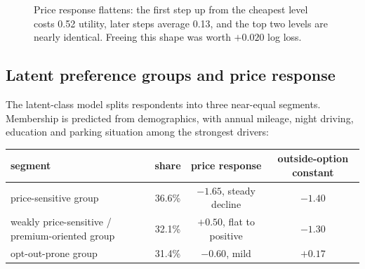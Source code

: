 \documentclass[11pt]{article}
\begin{document}
\begin{figure}[b]
\centering
{}
\caption{Price response flattens: the first step up from the cheapest level costs 0.52
utility, later steps average 0.13, and the top two levels are nearly identical. Freeing
this shape was worth $+0.020$ log loss.}
\label{fig:price}
\end{figure}

\subsection{Latent preference groups and price response}

The latent-class model splits respondents into three near-equal segments. Membership is
predicted from demographics, with annual mileage, night driving, education and parking
situation among the strongest drivers:

\begin{center}\small
\begin{tabular}{lccc}
\toprule
segment & share & price response & outside-option constant \\
\midrule
price-sensitive group & 36.6\% & $-1.65$, steady decline & $-1.40$ \\
weakly price-sensitive / premium-oriented group & 32.1\% & $+0.50$, flat to positive & $-1.30$ \\
opt-out-prone group & 31.4\% & $-0.60$, mild & $+0.17$ \\
\bottomrule
\end{tabular}
\end{center}
\end{document}
